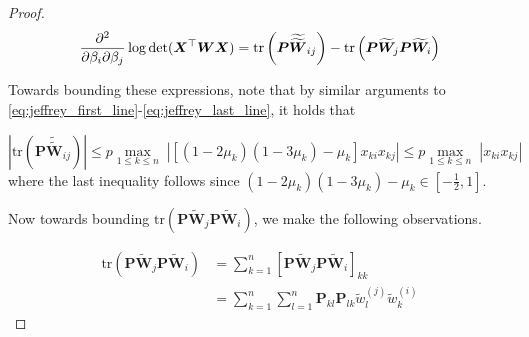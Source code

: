 \documentclass[11pt, a4paper]{article}
\newcommand*{\bb}{\boldsymbol}
\theoremstyle{example} \newtheorem{example}{Example}[section]
\theoremstyle{theorem} \newtheorem{theorem}{Theorem}[section]
\theoremstyle{theorem }\newtheorem{proposition}{Proposition}[section]
\theoremstyle{theorem }\newtheorem{corollary}{Corollary}[section]
\def\det{{\mathop{\rm det}}}
\def\\bbeta{\bb{\\bbeta}}
\begin{document}
\begin{proof}
\begin{equation}
\frac{\partial^2}{\partial \beta_i \partial \beta_j} \log\det (\bb X^\top\bb W \bb X) =\textrm{tr}\left(\bb P\widetilde{\widetilde{\bb W}}_{ij} \right) - \textrm{tr}\left(\bb P\widetilde{\bb W}_j \bb P\widetilde{\bb W}_i \right)
\end{equation}

Towards bounding these expressions, note that by similar arguments to \eqref{eq:jeffrey_first_line}-\eqref{eq:jeffrey_last_line}, it holds that 

\begin{equation}
\left|\textrm{tr}\left(\bb P\widetilde{\widetilde{\bb W}}_{ij} \right) \right| \leq p \underset{1\leq k\leq n}{\max} \; |\left[(1-2\mu_k)(1-3\mu_k)-\mu_k \right] x_{ki}x_{kj}| \leq p\underset{1\leq k\leq n}{\max} \; |x_{ki}x_{kj}|
\end{equation}
where the last inequality follows since $(1-2\mu_k)(1-3\mu_k)-\mu_k \in [-\frac{1}{2},1]$. 

Now towards bounding $\textrm{tr}\left(\bb P\widetilde{\bb W}_j \bb P\widetilde{\bb W}_i \right)$, we make the following observations. 

\begin{equation}
\begin{aligned}
\textrm{tr}\left(\bb P\widetilde{\bb W}_j \bb P\widetilde{\bb W}_i \right) &= \sum_{k=1}^{n} \left[\bb P\widetilde{\bb W}_j\bb P\widetilde{\bb W}_i\right]_{kk}\\ 
&= \sum_{k=1}^{n}\sum_{l=1}^{n}\bb P_{kl}\bb P_{lk}\widetilde{w}^{(j)}_l\widetilde{w}^{(i)}_k
\end{aligned}
\end{equation}


\end{proof}
\end{document}
